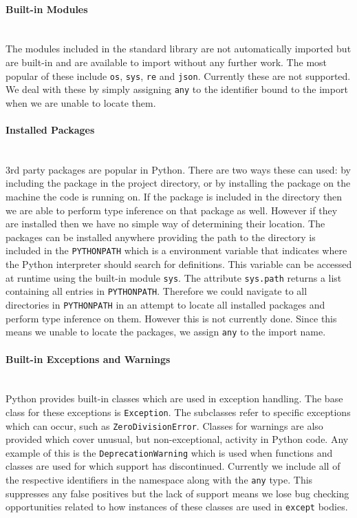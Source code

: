 \documentclass[12pt, titlepage]{article}
\begin{document}
\paragraph*{Built-in Modules}\mbox{} \\
The modules included in the standard library are not automatically imported but are built-in and are available to import without any further work. The most popular of these include \texttt{os}, \texttt{sys}, \texttt{re} and \texttt{json}. Currently these are not supported. We deal with these by simply assigning \texttt{any} to the identifier bound to the import when we are unable to locate them.

\paragraph*{Installed Packages}\mbox{} \\
3rd party packages are popular in Python. There are two ways these can used: by including the package in the project directory, or by installing the package on the machine the code is running on. If the package is included in the directory then we are able to perform type inference on that package as well. However if they are installed then we have no simple way of determining their location. The packages can be installed anywhere providing the path to the directory is included in the \texttt{PYTHONPATH} which is a environment variable that indicates where the Python interpreter should search for definitions. This variable can be accessed at runtime using the built-in module \texttt{sys}. The attribute \texttt{sys.path} returns a list containing all entries in \texttt{PYTHONPATH}. Therefore we could navigate to all directories in \texttt{PYTHONPATH} in an attempt to locate all installed packages and perform type inference on them. However this is not currently done. Since this means we unable to locate the packages, we assign \texttt{any} to the import name.

\paragraph*{Built-in Exceptions and Warnings} \mbox{} \\
Python provides built-in classes which are used in exception handling. The base class for these exceptions is \texttt{Exception}. The subclasses refer to specific exceptions which can occur, such as \texttt{ZeroDivisionError}. Classes for warnings are also provided which cover unusual, but non-exceptional, activity in Python code. Any example of this is the \texttt{DeprecationWarning} which is used when functions and classes are used for which support has discontinued. Currently we include all of the respective identifiers in the namespace along with the \texttt{any} type. This suppresses any false positives but the lack of support means we lose bug checking opportunities related to how instances of these classes are used in \texttt{except} bodies.
\end{document}
